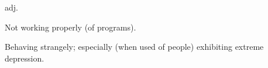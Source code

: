  adj.

\begin{inparaenum}
\item Not working properly (of programs).
\item Behaving strangely; especially (when used of people) exhibiting extreme
    depression.
\end{inparaenum}

